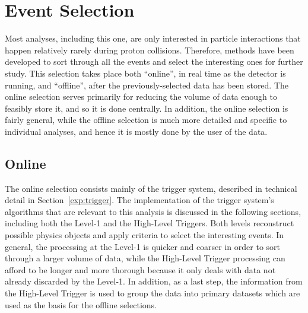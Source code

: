 \chapter{Event Selection}
\label{evSel}
Most analyses, including this one, are only interested in particle 
interactions that happen relatively rarely during proton collisions.  
Therefore, methods have been developed to sort through all the 
events and select the interesting ones for further study.  
This selection takes place both ``online'', in real time as the 
detector is running, and ``offline'', after the previously-selected data has 
been stored.  
The online selection serves primarily for reducing the 
volume of data enough to feasibly store it, and so it is done centrally. 
In addition, the online selection is fairly general, 
while the offline selection is much more detailed and specific to individual 
analyses, and hence it is mostly done by the user of the data.  


\section{Online}
\label{evSel:online}
The online selection consists mainly of the trigger system, 
described in technical detail in Section~\ref{exp:trigger}.  
The implementation of the trigger system's algorithms 
that are relevant to this analysis 
is discussed in the following sections, 
including both the Level-1 and the High-Level Triggers.  
Both levels reconstruct possible physics objects 
and apply criteria to select the interesting events.  
In general, the processing at the Level-1 is quicker 
and coarser in order to sort through a larger volume of data, 
while the High-Level Trigger processing can afford to be 
longer and more thorough because it only deals with 
data not already discarded by the Level-1.  
In addition, as a last step, the information 
from the High-Level Trigger is used to 
group the data into primary datasets
which are used as the basis for the offline selections.  

